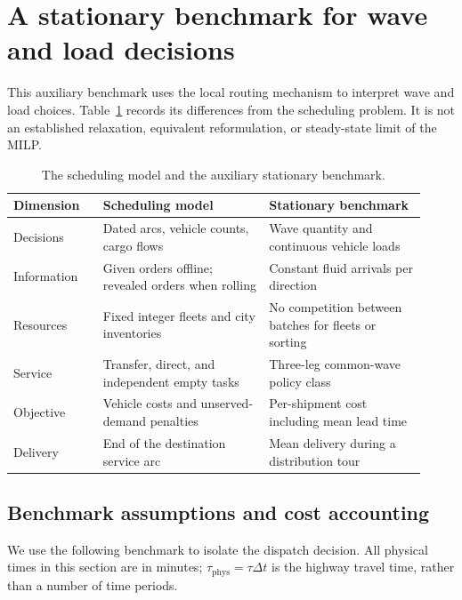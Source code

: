 \section{A stationary benchmark for wave and load decisions}
\label{sec:analysis}

This auxiliary benchmark uses the local routing mechanism to interpret wave
and load choices. Table~\ref{tab:model-scope} records its differences from the
scheduling problem. It is not an established relaxation, equivalent
reformulation, or steady-state limit of the MILP.

\begin{table}[tbp]
\centering\small
\caption{The scheduling model and the auxiliary stationary benchmark.}
\label{tab:model-scope}
\begin{tabular}{@{}p{0.20\linewidth}p{0.37\linewidth}p{0.35\linewidth}@{}}
\toprule
Dimension & Scheduling model & Stationary benchmark\\
\midrule
Decisions & Dated arcs, vehicle counts, cargo flows & Wave quantity and continuous vehicle loads\\
Information & Given orders offline; revealed orders when rolling & Constant fluid arrivals per direction\\
Resources & Fixed integer fleets and city inventories & No competition between batches for fleets or sorting\\
Service & Transfer, direct, and independent empty tasks & Three-leg common-wave policy class\\
Objective & Vehicle costs and unserved-demand penalties & Per-shipment cost including mean lead time\\
Delivery & End of the destination service arc & Mean delivery during a distribution tour\\
\bottomrule
\end{tabular}
\end{table}

\subsection{Benchmark assumptions and cost accounting}
\label{subsec:benchmark}

We use the following benchmark to isolate the dispatch decision. All physical
times in this section are in minutes; $\tau_{\mathrm{phys}}=\tau\Delta t$ is
the highway travel time, rather than a number of time periods.

